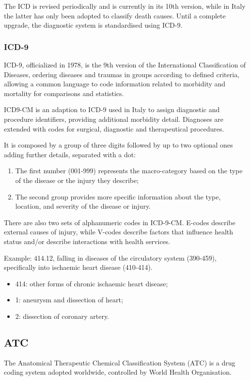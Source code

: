The ICD is revised periodically and is currently in its 10th version, while in Italy the latter has only been adopted to classify death causes\cite{icdit}. Until a complete upgrade, the diagnostic system is standardised using ICD-9.

\subsubsection{ICD-9}
ICD-9, officialized in 1978, is the 9th version of the International Classification of Diseases, ordering diseases and traumas in groups according to defined criteria, allowing a common language to code information related to morbidity and mortality for comparisons and statistics\cite{icdit}.

ICD9-CM is an adaption to ICD-9 used in Italy to assign diagnostic and procedure identifiers, providing additional morbidity detail. Diagnoses are extended with codes for surgical, diagnostic and therapeutical procedures. 

It is composed by a group of three digits followed by up to two optional ones adding further details, separated with a dot:
\begin{enumerate}
	\item The first number (001-999) represents the macro-category based on the type of the disease or the injury they describe;
	\item The second group provides more specific information about the type, location, and severity of the disease or injury.
\end{enumerate}

There are also two sets of alphanumeric codes in ICD-9-CM. E-codes describe external causes of injury, while V-codes describe factors that influence health status and/or describe interactions with health services\cite{icd9en}.

Example: 414.12, falling in diseases of the circulatory system (390-459), specifically into ischaemic heart disease (410-414).
\begin{itemize}
	\item 414: other forms of chronic ischaemic heart disease;
		\item 1: aneurysm and dissection of heart;
			\item 2: dissection of coronary artery.
\end{itemize}

\subsection{ATC}
The Anatomical Therapeutic Chemical Classification System (ATC) is a drug coding system adopted worldwide, controlled by World Health Organisation.

